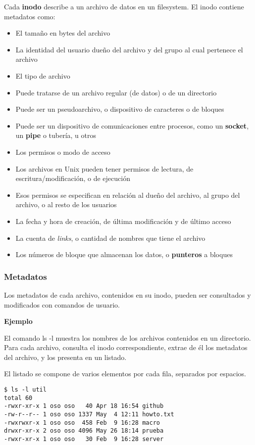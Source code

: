 \documentclass[spanish,A4,]{article}
\begin{document}
Cada \textbf{inodo} describe a un archivo de datos en un filesystem. El
inodo contiene metadatos como:

\begin{itemize}
\itemsep1pt\parskip0pt
\item
  El tamaño en bytes del archivo
\item
  La identidad del usuario dueño del archivo y del grupo al cual
  pertenece el archivo
\item
  El tipo de archivo
\item
  Puede tratarse de un archivo regular (de datos) o de un directorio
\item
  Puede ser un pseudoarchivo, o dispositivo de caracteres o de bloques
\item
  Puede ser un dispositivo de comunicaciones entre procesos, como un
  \textbf{socket}, un \textbf{pipe} o tubería, u otros
\item
  Los permisos o modo de acceso
\item
  Los archivos en Unix pueden tener permisos de lectura, de
  escritura/modificación, o de ejecución
\item
  Esos permisos se especifican en relación al dueño del archivo, al
  grupo del archivo, o al resto de los usuarios
\item
  La fecha y hora de creación, de última modificación y de último acceso
\item
  La cuenta de \emph{links}, o cantidad de nombres que tiene el archivo
\item
  Los números de bloque que almacenan los datos, o \textbf{punteros} a
  bloques
\end{itemize}

\subsubsection{Metadatos}\label{metadatos-1}

Los metadatos de cada archivo, contenidos en su inodo, pueden ser
consultados y modificados con comandos de usuario.

\textbf{Ejemplo}

El comando ls -l muestra los nombres de los archivos contenidos en un
directorio. Para cada archivo, consulta el inodo correspondiente, extrae
de él los metadatos del archivo, y los presenta en un listado.

El listado se compone de varios elementos por cada fila, separados por
espacios.

\begin{verbatim}
$ ls -l util
total 60
-rwxr-xr-x 1 oso oso   40 Apr 18 16:54 github
-rw-r--r-- 1 oso oso 1337 May  4 12:11 howto.txt
-rwxrwxr-x 1 oso oso  458 Feb  9 16:28 macro
drwxr-xr-x 2 oso oso 4096 May 26 18:14 prueba
-rwxr-xr-x 1 oso oso   30 Feb  9 16:28 server
\end{verbatim}
\end{document}
